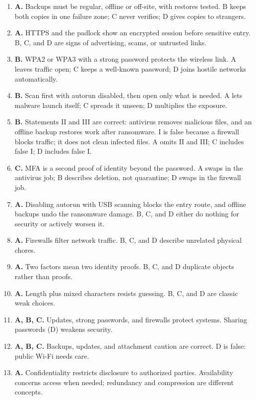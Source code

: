 \begin{enumerate}[label=\textbf{Q\arabic*.}, leftmargin=*]
  Confidentiality (A) is protected by passwords and encryption; integrity (B)
  by clean copies and signatures; authentication (D) is not a leg of the
  triad.
\item \textbf{A.} Backups must be regular, offline or off-site, with restores
  tested. B keeps both copies in one failure zone; C never verifies; D gives
  copies to strangers.
\item \textbf{A.} HTTPS and the padlock show an encrypted session before
  sensitive entry. B, C, and D are signs of advertising, scams, or untrusted
  links.
\item \textbf{B.} WPA2 or WPA3 with a strong password protects the wireless
  link. A leaves traffic open; C keeps a well-known password; D joins hostile
  networks automatically.
\item \textbf{B.} Scan first with autorun disabled, then open only what is
  needed. A lets malware launch itself; C spreads it unseen; D multiplies the
  exposure.
\item \textbf{B.} Statements II and III are correct: antivirus removes
  malicious files, and an offline backup restores work after ransomware. I is
  false because a firewall blocks traffic; it does not clean infected files.
  A omits II and III; C includes false I; D includes false I.
\item \textbf{C.} MFA is a second proof of identity beyond the password. A
  swaps in the antivirus job; B describes deletion, not quarantine; D swaps in
  the firewall job.
\item \textbf{A.} Disabling autorun with USB scanning blocks the entry route,
  and offline backups undo the ransomware damage. B, C, and D either do
  nothing for security or actively worsen it.

\item \textbf{A.} Firewalls filter network traffic. B, C, and D describe unrelated physical chores.
\item \textbf{A.} Two factors mean two identity proofs. B, C, and D duplicate objects rather than proofs.
\item \textbf{A.} Length plus mixed characters resists guessing. B, C, and D are classic weak choices.
\item \textbf{A, B, C.} Updates, strong passwords, and firewalls protect systems. Sharing passwords (D) weakens security.
\item \textbf{A, B, C.} Backups, updates, and attachment caution are correct. D is false: public Wi-Fi needs care.
\item \textbf{A.} Confidentiality restricts disclosure to authorized parties. Availability concerns access when needed; redundancy and compression are different concepts.


\end{enumerate}
